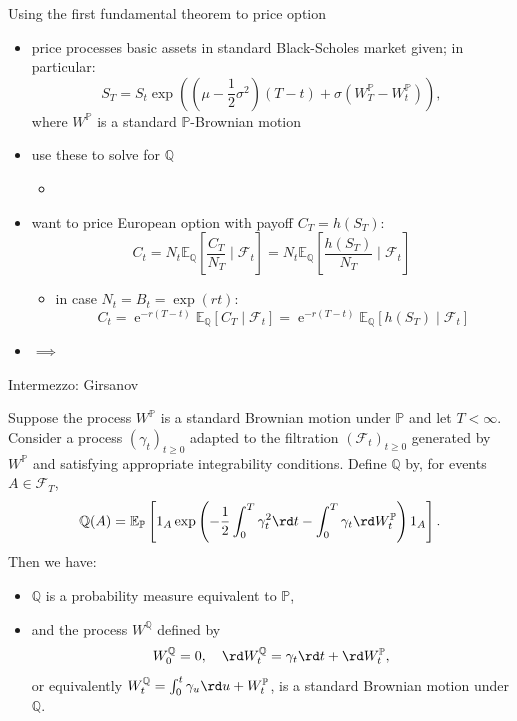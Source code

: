 \documentclass[pdf, handout]{beamer}
\newcommand{\e}{\operatorname{e}}
\begin{document}
\begin{frame}{Using the first fundamental theorem to price option}
\begin{itemize}
\item price processes basic assets in standard Black-Scholes market given; in particular: 
\[
S_T = S_t \exp\left(  (\mu - \frac{1}{2}\sigma^2)(T-t) + \sigma (W_T^{\mathbb{P}} - W_t^{\mathbb{P}})   \right),
\]
where $W^{\mathbb{P}}$ is a standard $\mathbb{P}$-Brownian motion
\item use these to solve for $\mathbb{Q}$
\begin{itemize}
\item \textbf{\color{red}{how?}  }
\end{itemize}
\item want to price European option with payoff $C_T=h(S_T)$:
\[
C_t=N_t \mathbb{E}_{\mathbb{Q}}\left[ \frac{C_T}{N_T} \mid \mathcal{F}_t  \right]
=N_t \mathbb{E}_{\mathbb{Q}}\left[ \frac{h(S_T)}{N_T} \mid \mathcal{F}_t  \right]
\]
\begin{itemize}
\item in case $N_t=B_t=\exp(rt)$:
\[
C_t=\e^{-r(T-t)} \mathbb{E}_{\mathbb{Q}}\left[  C_T \mid \mathcal{F}_t  \right]
=\e^{-r(T-t)} \mathbb{E}_{\mathbb{Q}}\left[  h(S_T) \mid \mathcal{F}_t  \right]
\]
\end{itemize}
\item $\implies$
\textbf{}
\end{itemize}

\end{frame}
%
\begin{frame}{Intermezzo: Girsanov}
\begin{theorem}[Girsanov]
\small{
Suppose the process $W^{\mathbb{P}}$ is a standard Brownian motion under $\mathbb{P}$ and  let $T<\infty$.
Consider a process $(\gamma_t)_{t\geq 0}$  adapted to the filtration $(\mathcal{F}_t)_{t\geq 0}$  generated by $W^{\mathbb{P}}$ and
satisfying appropriate integrability conditions.
Define
$\mathbb{Q}$ by, for events $A \in\mathcal{F}_T$,
\[
\mathbb{Q}(A)=%
\mathbb{E}_{\mathbb{P}}\left[ 1_A \exp\left(  -\frac{1}{2} \int_0^T \gamma_t^2 \rd t   - \int_0^T \gamma_t  \rd W^{\mathbb{P}}_t         \right)1_A\right].
\]
Then we have:
\begin{itemize}
\item
$\mathbb{Q}$ is a probability measure equivalent to $\mathbb{P}$,
\item and the process $W^{\mathbb{Q}}$ defined by
\[
W^{\mathbb{Q}}_0=0,\quad
\rd W^{\mathbb{Q}}_t=\gamma_t \rd t + \rd W^{\mathbb{P}}_t 
,
\]
or equivalently $
W^{\mathbb{Q}}_t=\int_0^t \gamma_u \rd u +  W^{\mathbb{P}}_t$,
is a standard Brownian motion under $\mathbb{Q}$.
\end{itemize}
}
\end{theorem}
\end{frame}
\end{document}
